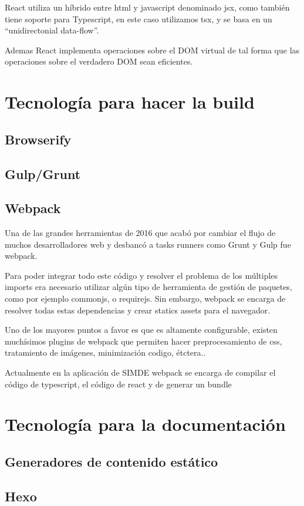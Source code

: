 \bigskip
React utiliza un híbrido entre html y javascript denominado jsx, como también tiene soporte para 
Typescript, en este caso utilizamos tsx, y se basa en un “unidirectonial data-flow”. 

\bigskip
Ademas React implementa operaciones sobre el DOM virtual de tal forma que las operaciones sobre
el verdadero DOM sean eficientes.

\section{Tecnología para hacer la build}
\label{3:sec3}

\subsection{Browserify}

\subsection{Gulp/Grunt}

\subsection{Webpack}
\bigskip
Una de las grandes herramientas de 2016 que acabó por cambiar el flujo de muchos 
desarrolladores web y desbancó a tasks runners como Grunt y Gulp fue webpack.

\bigskip
Para poder integrar todo este código y resolver el problema de los múltiples imports 
era necesario utilizar algún tipo de herramienta de gestión de paquetes, como por ejemplo 
commonjs, o requirejs. Sin embargo, webpack se encarga de resolver todas estas 
dependencias y crear statics assets para el navegador.

\bigskip
Uno de los mayores puntos a favor es que es altamente configurable, existen muchísimos 
plugins de webpack que permiten hacer preprocesamiento de css, tratamiento de imágenes,
minimización codigo, étctera.. 

\bigskip
Actualmente en la aplicación de SIMDE webpack  se encarga de compilar el código de 
typescript, el código de react y de generar un bundle 

\section{Tecnología para la documentación}
\label{3:sec4}

\subsection{Generadores de contenido estático}

\subsection{Hexo}

